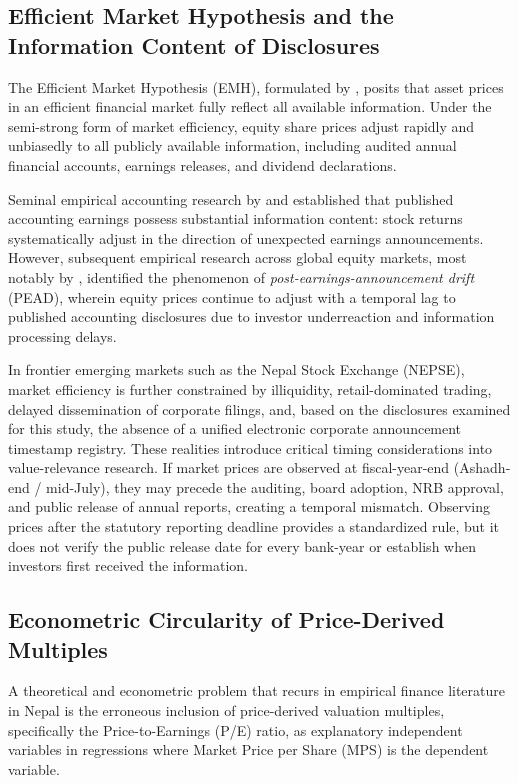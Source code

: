 \subsection{Efficient Market Hypothesis and the Information Content of Disclosures}
\label{subsec:emh_pead}

The Efficient Market Hypothesis (EMH), formulated by \citet{fama1970}, posits that asset prices in an efficient financial market fully reflect all available information. Under the semi-strong form of market efficiency, equity share prices adjust rapidly and unbiasedly to all publicly available information, including audited annual financial accounts, earnings releases, and dividend declarations.

Seminal empirical accounting research by \citet{ball1968} and \citet{beaver1968} established that published accounting earnings possess substantial information content: stock returns systematically adjust in the direction of unexpected earnings announcements. However, subsequent empirical research across global equity markets, most notably by \citet{bernard1989}, identified the phenomenon of \textit{post-earnings-announcement drift} (PEAD), wherein equity prices continue to adjust with a temporal lag to published accounting disclosures due to investor underreaction and information processing delays.

In frontier emerging markets such as the Nepal Stock Exchange (NEPSE), market efficiency is further constrained by illiquidity, retail-dominated trading, delayed dissemination of corporate filings, and, based on the disclosures examined for this study, the absence of a unified electronic corporate announcement timestamp registry. These realities introduce critical timing considerations into value-relevance research. If market prices are observed at fiscal-year-end (Ashadh-end / mid-July), they may precede the auditing, board adoption, NRB approval, and public release of annual reports, creating a temporal mismatch. Observing prices after the statutory reporting deadline provides a standardized rule, but it does not verify the public release date for every bank-year or establish when investors first received the information.

\subsection{Econometric Circularity of Price-Derived Multiples}
\label{subsec:pe_circularity}

A theoretical and econometric problem that recurs in empirical finance literature in Nepal is the erroneous inclusion of price-derived valuation multiples, specifically the Price-to-Earnings (P/E) ratio, as explanatory independent variables in regressions where Market Price per Share (MPS) is the dependent variable.

